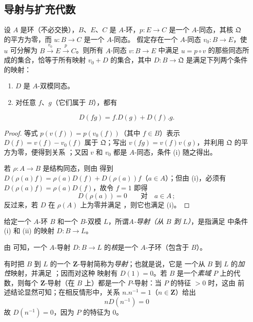 \subsection{导射与扩充代数}
\label{subsection:0.20.1-fr}

\begin{proposition}[20.1.1]
\label{0.20.1.1-fr}
设 $A$ 是环（不必交换），$B$、$E$、$C$ 是 $A$-环，$p:E\to C$ 是一个
$A$-同态，其核 $\mathfrak{Q}$ 的平方为零，而 $u:B\to C$ 是一个 $A$-同态。
假定存在一个 $A$-同态 $v_0:B\to E$，使 $u$ 可分解为
$B\xrightarrow{v_0}E\xrightarrow{p}C$。则所有 $A$-同态 $v:B\to E$
中满足 $u=p\circ v$ 的那些同态所成的集合，恰等于所有映射 $v_0+D$ 的集合，其中
$D:B\to\mathfrak{Q}$ 是满足下列两个条件的映射：
\begin{enumerate}
  \item[\rm(i)] $D$ 是 $A$-双模同态。
  \item[\rm(ii)] 对任意 $f$、$g$（它们属于 $B$），都有
\end{enumerate}
\begin{equation}
\tag{20.1.1.1}
\label{0.20.1.1.1-fr}
  D(fg)=f.D(g)+D(f).g.
\end{equation}
\end{proposition}

\begin{proof}
等式 $p(v(f))=p(v_0(f))$（其中 $f\in B$）表示
$D(f)=v(f)-v_0(f)$ 属于 $\mathfrak{Q}$；写出 $v(fg)=v(f)v(g)$，并利用
$\mathfrak{Q}$ 的平方为零，便得到关系 ；又因 $v$ 和
$v_0$ 都是 $A$-同态，条件 (i) 随之得出。

若 $\rho:A\to B$ 是结构同态，则由  得到
$D(\rho(a)f)=\rho(a)D(f)+D(\rho(a))f$（$a\in A$）；但由 (i)，必须有
$D(\rho(a)f)=\rho(a)D(f)$，故令 $f=1$ 即得
\[
  D(\rho(a))=0 \qquad\text{对}\quad a\in A\,;
\]
反过来，若 $D$ 在 $\rho(A)$ 上为零并满足 ，则它也满足 (i)。
\end{proof}

\begin{definition}[20.1.2]
\label{0.20.1.2-fr}
给定一个 $A$-环 $B$ 和一个 $B$-双模 $L$，所谓\emph{$A$-导射（从 $B$ 到
$L$）}，是指满足  中条件 (i) 和 (ii) 的映射 $D:B\to L$。
\end{definition}

由  可知，一个 $A$-导射 $D:B\to L$ 的\emph{核}是一个
$A$-子环（包含于 $B$）。

有时把 $B$ 到 $L$ 的一个 $\mathbf{Z}$-导射简称为\emph{导射}；也就是说，它是
一个从 $B$ 到 $L$ 的\emph{加性}映射，并满足 ；因而对这种
映射有 $D(1)=0$。若 $B$ 是一个\emph{素域} $P$ 上的代数，则每个
$\mathbf{Z}$-导射（在 $B$ 上）都是一个 $P$-导射：当 $P$ 的特征 $>0$ 时，这由
前述结论显然可知；在相反情形中，关系 $n.n^{-1}=1$（$n\in\mathbf{Z}$）给出
\[
  nD(n^{-1})=0
\]
故 $D(n^{-1})=0$，因为 $P$ 的特征为 $0$。

